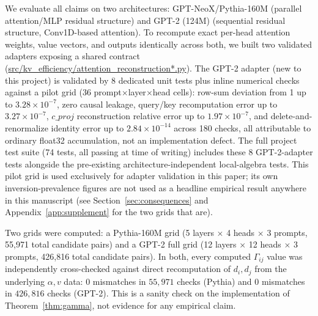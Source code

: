 \documentclass[11pt]{article}
\begin{document}
We evaluate all claims on two architectures: GPT-NeoX/Pythia-160M (parallel
attention/MLP residual structure) and GPT-2 (124M) (sequential residual
structure, Conv1D-based attention). To recompute exact per-head attention
weights, value vectors, and outputs identically across both, we built two
validated adapters exposing a shared contract
(\url{src/kv_efficiency/attention_reconstruction*.py}). The GPT-2
adapter (new to this project) is validated by 8 dedicated unit tests plus
inline numerical checks against a pilot grid (36 prompt$\times$layer$\times$head
cells): row-sum deviation from 1 up to $3.28\times10^{-7}$, zero causal
leakage, query/key recomputation error up to $3.27\times10^{-7}$, $c\_proj$
reconstruction relative error up to $1.97\times10^{-7}$, and
delete-and-renormalize identity error up to $2.84\times10^{-14}$ across 180
checks, all attributable to ordinary float32 accumulation, not an
implementation defect. The full project test suite (74 tests, all passing
at time of writing) includes these 8 GPT-2-adapter tests alongside the
pre-existing architecture-independent local-algebra tests. This pilot grid
is used exclusively for adapter validation in this paper; its own
inversion-prevalence figures are not used as a headline empirical result
anywhere in this manuscript (see Section~\ref{sec:consequences} and
Appendix~\ref{app:supplement} for the two grids that are).

Two grids were computed: a Pythia-160M grid (5 layers $\times$ 4 heads
$\times$ 3 prompts, 55{,}971 total candidate pairs) and a GPT-2 full grid
(12 layers $\times$ 12 heads $\times$ 3 prompts, 426{,}816 total candidate
pairs). In both, every computed $\Gamma_{ij}$ value was independently
cross-checked against direct recomputation of $d_i,d_j$ from the underlying
$\alpha,v$ data: $0$ mismatches in $55{,}971$ checks (Pythia) and $0$
mismatches in $426{,}816$ checks (GPT-2). This is a sanity check on the
implementation of Theorem~\ref{thm:gamma}, not evidence for any empirical
claim.
\end{document}
